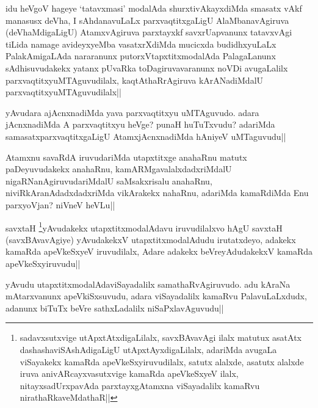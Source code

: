 
\begin{artha}
idu heVgoV hageye `tatavxmasi' modalAda shurxtivAkayxdiMda smasatx vAkf manasusx deVha, I sAhdanavuLaLx parxvaqtitxgaLigU  AlaMbanavAgiruva (deVhaMdigaLigU) AtamxvAgiruva parxtayxkf savxrUapvanunx tatavxvAgi tiLida namage avideyxyeMba vasatxrXdiMda mucicxda budidhxyuLaLx PalakAmigaLAda nararanunx putorxVtapxtitxmodalAda PalagaLanunx sAdhisuvudakekx yatanx pUvaRka toDagiruvavaranunx noVDi avugaLalilx parxvaqtitxyuMTAguvudilalx, kaqtAthaRrAgiruva kArANadiMdalU parxvaqtitxyuMTAguvudilalx||
\end{artha}

\begin{artha}
yAvudara ajAcnxnadiMda yava parxvaqtitxyu uMTAguvudo. adara jAcnxnadiMda A parxvaqtitxyu heVge? punaH huTuTxvudu? adariMda samasatxparxvaqtitxgaLigU AtamxjAcnxnadiMda hAniyeV uMTaguvudu||
\end{artha}

\begin{artha}
Atamxnu savaRdA iruvudariMda utapxtitxge anahaRnu matutx paDeyuvudakekx anahaRnu, kamARMgavalalxdadxriMdalU nigaRNanAgiruvudariMdalU saMsakxrisalu anahaRnu, niviRkAranAdadxdadxriMda vikArakekx nahaRnu, adariMda kamaRdiMda Enu parxyoVjan? niVneV heVLu||
\end{artha}

\begin{artha}
savxtaH \footnote{sadavxsutxvige utApxtAtxdigaLilalx, savxBAvavAgi ilalx matutux asatAtx dashashaviSAshAdigaLigU utApxtAyxdigaLilalx, adariMda avugaLa viSayakekx kamaRda apeVkeSxyiruvudilalx, satutx alalxde, asatutx alalxde iruva anivARcayxvasutxvige kamaRda apeVkeSxyeV ilalx, nitayxsadUrxpavAda parxtayxgAtamxna viSayadalilx kamaRvu nirathaRkaveMdathaR||}yAvudakekx utapxtitxmodalAdavu iruvudilalxvo hAgU savxtaH (savxBAvavAgiye) yAvudakekxV utapxtitxmodalAdudu irutatxdeyo, adakekx kamaRda apeVkeSxyeV iruvudilalx, Adare adakekx beVreyAdudakekxV kamaRda apeVkeSxyiruvudu||
\end{artha}


\begin{artha}
yAvudu utapxtitxmodalAdaviSayadalilx samathaRvAgiruvudo. adu kAraNa mAtarxvanunx 
apeVkiSxsuvudu, adara viSayadalilx kamaRvu PalavuLaLxdudx, adanunx biTuTx beVre 
sathxLadalilx niSaPxlavAguvudu||
\end{artha}

